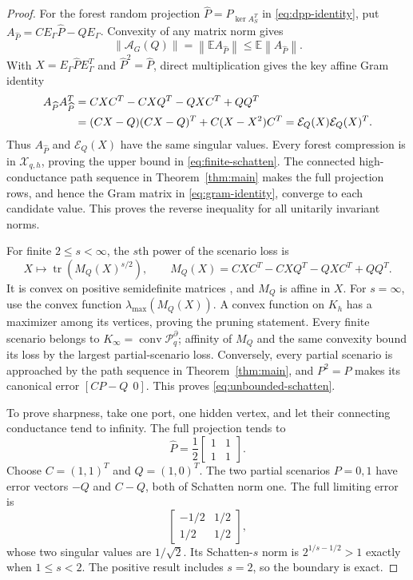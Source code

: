 \documentclass[11pt]{article}
\theoremstyle{definition}
\theoremstyle{remark}
\newcommand{\conv}{\operatorname{conv}}
\newcommand{\tr}{\operatorname{tr}}
\newcommand{\cX}{\mathcal X}
\newcommand{\cP}{\mathcal P}
\newcommand{\cE}{\mathcal E}
\newcommand{\cA}{\mathcal A}
\newcommand{\norm}[1]{\left\lVert #1\right\rVert}
\begin{document}
\begin{proof}
For the forest random projection $\widehat P=P_{\ker A_S^T}$ in
\eqref{eq:dpp-identity}, put
$A_{\widehat P}=CE_\Gamma\widehat P-QE_\Gamma$.  Convexity of any matrix norm
gives
\[
  \norm{\cA_G(Q)}
  =\norm{\mathbb E A_{\widehat P}}
  \leq\mathbb E\norm{A_{\widehat P}}.
\]
With $X=E_\Gamma\widehat PE_\Gamma^T$ and $\widehat P^2=\widehat P$, direct
multiplication gives the key affine Gram identity
\begin{align}
  A_{\widehat P}A_{\widehat P}^T
  &=CXC^T-CXQ^T-QXC^T+QQ^T \notag\\
  &=(CX-Q)(CX-Q)^T+C(X-X^2)C^T
   =\cE_Q(X)\cE_Q(X)^T.
  \label{eq:gram-identity}
\end{align}
Thus $A_{\widehat P}$ and $\cE_Q(X)$ have the same singular values.  Every
forest compression is in $\cX_{q,h}$, proving the upper bound in
\eqref{eq:finite-schatten}.  The connected high-conductance path sequence in
Theorem~\ref{thm:main} makes the full projection rows, and hence the Gram
matrix in \eqref{eq:gram-identity}, converge to each candidate value.  This
proves the reverse inequality for all unitarily invariant norms.

For finite $2\leq s<\infty$, the $s$th power of the scenario loss is
\[
  X\longmapsto\tr\left(M_Q(X)^{s/2}\right),
  \qquad M_Q(X)=CXC^T-CXQ^T-QXC^T+QQ^T.
\]
It is convex on positive semidefinite matrices \cite{bhatia1997}, and $M_Q$ is affine in $X$.
For $s=\infty$, use the convex function
$\lambda_{\max}(M_Q(X))$.  A convex function on $K_h$ has a maximizer among
its vertices, proving the pruning statement.  Every finite scenario belongs
to $K_\infty=\conv\cP_q^\partial$; affinity of $M_Q$ and the same convexity
bound its loss by the largest partial-scenario loss.  Conversely, every
partial scenario is approached by the path sequence in
Theorem~\ref{thm:main}, and $P^2=P$ makes its canonical error
$[CP-Q\ \ 0]$.  This proves \eqref{eq:unbounded-schatten}.

To prove sharpness, take one port, one hidden vertex, and let their connecting
conductance tend to infinity.  The full projection tends to
\[
  \widehat P=\frac12\begin{bmatrix}1&1\\1&1\end{bmatrix}.
\]
Choose
$C=(1,1)^T$ and $Q=(1,0)^T$.  The two partial scenarios $P=0,1$ have error
vectors $-Q$ and $C-Q$, both of Schatten norm one.  The full limiting error is
\[
  \begin{bmatrix}-1/2&1/2\\1/2&1/2\end{bmatrix},
\]
whose two singular values are $1/\sqrt2$.  Its Schatten-$s$ norm is
$2^{1/s-1/2}>1$ exactly when $1\leq s<2$.  The positive result includes
$s=2$, so the boundary is exact.
\end{proof}
\end{document}
